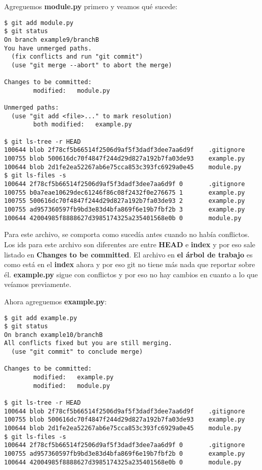 Agreguemos {\bf module.py} primero y veamos qué sucede:

\begin{lstlisting}[style=console_style,
	basicstyle=\small,
	caption=Luego de agregar {\bf module.py}]
$ git add module.py 
$ git status         
On branch example9/branchB
You have unmerged paths.
  (fix conflicts and run "git commit")
  (use "git merge --abort" to abort the merge)

Changes to be committed:
        modified:   module.py

Unmerged paths:
  (use "git add <file>..." to mark resolution)
        both modified:   example.py

$ git ls-tree -r HEAD
100644 blob 2f78cf5b66514f2506d9af5f3dadf3dee7aa6d9f    .gitignore
100755 blob 500616dc70f4847f244d29d827a192b7fa03de93    example.py
100644 blob 2d1fe2ea52267ab6e75cca853c393fc6929a0e45    module.py
$ git ls-files -s    
100644 2f78cf5b66514f2506d9af5f3dadf3dee7aa6d9f 0       .gitignore
100755 b0a7eae10629dec61246f86c08f2432f0e276675 1       example.py
100755 500616dc70f4847f244d29d827a192b7fa03de93 2       example.py
100755 ad957360597fb9bd3e83d4bfa869f6e19b7fbf2b 3       example.py
100644 42004985f8888627d3985174325a235401568e0b 0       module.py
\end{lstlisting}

Para este archivo, se comporta como sucedía antes cuando no había conflictos. Los ids para este archivo son diferentes are 
entre {\bf HEAD} e {\bf index} y por eso sale listado en {\bf Changes to be committed}. El archivo en {\bf el árbol de trabajo}
es como está en el {\bf index} ahora y por eso git no tiene más nada que reportar sobre él. {\bf example.py} sigue con conflictos
y por eso no hay cambios en cuanto a lo que veíamos previamente.

Ahora agreguemos {\bf example.py}:

\begin{lstlisting}[style=console_style,
	basicstyle=\small,
	caption=Luego de agregar {\bf example.py}]
$ git add example.py 
$ git status
On branch example10/branchB
All conflicts fixed but you are still merging.
  (use "git commit" to conclude merge)

Changes to be committed:
        modified:   example.py
        modified:   module.py

$ git ls-tree -r HEAD
100644 blob 2f78cf5b66514f2506d9af5f3dadf3dee7aa6d9f    .gitignore
100755 blob 500616dc70f4847f244d29d827a192b7fa03de93    example.py
100644 blob 2d1fe2ea52267ab6e75cca853c393fc6929a0e45    module.py
$ git ls-files -s
100644 2f78cf5b66514f2506d9af5f3dadf3dee7aa6d9f 0       .gitignore
100755 ad957360597fb9bd3e83d4bfa869f6e19b7fbf2b 0       example.py
100644 42004985f8888627d3985174325a235401568e0b 0       module.py
\end{lstlisting}


